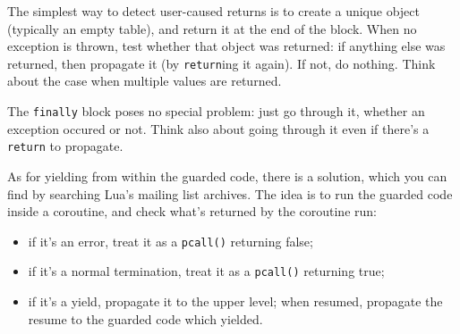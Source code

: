 The simplest way to detect user-caused returns is to create a unique
object (typically an empty table), and return it at the end of the
block. When no exception is thrown, test whether that object was
returned: if anything else was returned, then propagate it (by
{\tt return}ing it again). If not, do nothing. Think about the case
when multiple values are returned.

The {\tt finally} block poses no special problem: just go through it,
whether an exception occured or not. Think also about going through it
even if there's a {\tt return} to propagate.

As for yielding from within the guarded code, there is a solution,
which you can find by searching Lua's mailing list archives. The idea
is to run the guarded code inside a coroutine, and check what's
returned by the coroutine run:
\begin{itemize} 
\item if it's an error, treat it as a {\tt pcall()} returning false;
\item if it's a normal termination, treat it as a {\tt pcall()}
  returning true;
\item if it's a yield, propagate it to the upper level; when resumed,
  propagate the resume to the guarded code which yielded.
\end{itemize}
